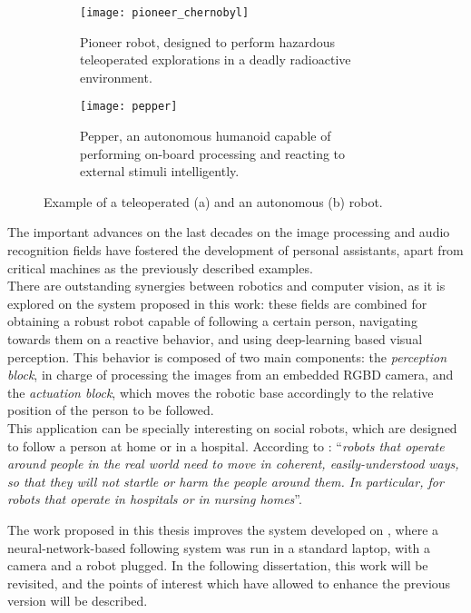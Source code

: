 \begin{figure}[h]
	\centering
	\begin{subfigure}[t]{0.45\textwidth}
		\centering
		\texttt{[image: pioneer\_chernobyl]}
		\caption{Pioneer robot, designed to perform hazardous teleoperated explorations in a deadly radioactive environment.}
		\label{fig:1_pioneer}
	\end{subfigure}
	\hfill
	\begin{subfigure}[t]{0.4\textwidth}
		\centering
		\texttt{[image: pepper]}
		\caption{Pepper, an autonomous humanoid capable of performing on-board processing and reacting to external stimuli intelligently.}
		\label{fig:1_pepper}
	\end{subfigure}
	\caption{Example of a teleoperated (a) and an autonomous (b) robot.}
	\label{fig:1_robots}
\end{figure}

The important advances on the last decades on the image processing and audio recognition fields have fostered the development of personal assistants, apart from critical machines as the previously described examples.\\



There are outstanding synergies between robotics and computer vision, as it is explored on the system proposed in this work: these fields are combined for obtaining a robust robot capable of following a certain person, navigating towards them on a reactive behavior, and using deep-learning based visual perception. This behavior is composed of two main components: the \textit{perception block}, in charge of processing the images from an embedded RGBD camera, and the \textit{actuation block}, which moves the robotic base accordingly to the relative position of the person to be followed.\\

This application can be specially interesting on social robots, which are designed to follow a person at home or in a hospital. According to \cite{natural_personfollowing}: ``\textit{robots that operate around people in the real world need to move in coherent, easily-understood ways, so that they will not startle or harm the people around them. In particular, for robots that operate in hospitals or in nursing homes}''. 



The work proposed in this thesis improves the system developed on \cite{tfg}, where a neural-network-based following system was run in a standard laptop, with a camera and a robot plugged. In the following dissertation, this work will be revisited, and the points of interest which have allowed to enhance the previous version will be described.\\
	
